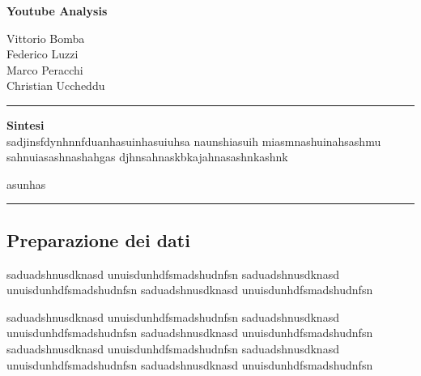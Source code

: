 \documentclass[10pt, a4paper,openany]{article}
\begin{document}
\begin{center}
\textbf{Youtube Analysis}
\end{center}

\begin{flushright}
Vittorio Bomba \\ Federico Luzzi \\  Marco Peracchi \\ Christian Uccheddu
\end{flushright}

\hrule
\vspace{0.5cm}

\centering\textbf{{Sintesi}}
\\
sadjinsfdynhnnfduanhasuinhasuiuhsa naunshiasuih miasmnashuinahsashmu sahnuiasashnashahgas djhnsahnaskbkajahnasashnkashnk

asunhas
\vspace{0.5cm}
\hrule

\begin{multicols}{2}
\section*{Preparazione dei dati}

saduadshnusdknasd unuisdunhdfsmadshudnfsn
saduadshnusdknasd unuisdunhdfsmadshudnfsn
saduadshnusdknasd unuisdunhdfsmadshudnfsn

saduadshnusdknasd unuisdunhdfsmadshudnfsn
saduadshnusdknasd unuisdunhdfsmadshudnfsn
saduadshnusdknasd unuisdunhdfsmadshudnfsn
saduadshnusdknasd unuisdunhdfsmadshudnfsn
saduadshnusdknasd unuisdunhdfsmadshudnfsn
saduadshnusdknasd unuisdunhdfsmadshudnfsn



\end{multicols}
\end{document}
